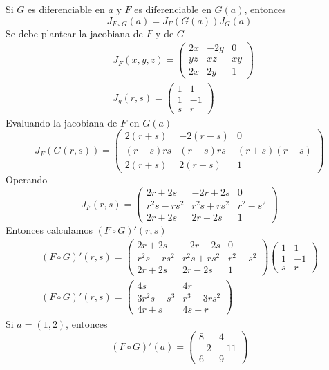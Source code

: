\documentclass[a4,11pt]{aleph-examen}
\begin{document}
\begin{preguntas}
\begin{respuesta}
\begin{respuesta}
\begin{respuesta} 
	Si $G$ es diferenciable en $a$ y $F$ es diferenciable en $G(a)$, entonces
    \[ 
        J_{F\circ G} (a)= J_F (G(a))J_G (a)
    \]
    Se debe plantear la jacobiana de $F$ y de $G$
    \begin{align*}
        &J_F(x,y,z) = \begin{pmatrix}
        2x & -2y & 0 \\
        yz & xz & xy\\
        2x & 2y & 1
        \end{pmatrix}\\
        &J_g(r,s) = \begin{pmatrix}
        1 & 1  \\
        1 & -1 \\
        s & r
        \end{pmatrix}
    \end{align*}
    Evaluando la jacobiana de $F$ en $G(a)$
    \[ 
        J_F(G(r,s)) = \begin{pmatrix}
        2(r+s) & -2(r-s) & 0 \\
        (r-s)rs & (r+s)rs & (r+s)(r-s)\\
        2(r+s) & 2(r-s) & 1
        \end{pmatrix}
    \]
    Operando
    \[ 
        J_F(r,s) = \begin{pmatrix}
        2r+2s & -2r+2s & 0 \\
        r^2s-rs^2 & r^2s+rs^2 & r^2-s^2\\
        2r+2s & 2r-2s & 1
        \end{pmatrix}
	\]
    Entonces calculamos $(F\circ G)'(r,s)$ 
    \begin{align*}
        (F\circ G)'(r,s)= \begin{pmatrix}
        2r+2s & -2r+2s & 0 \\
        r^2s-rs^2 & r^2s+rs^2 & r^2-s^2\\
        2r+2s & 2r-2s & 1
        \end{pmatrix} \begin{pmatrix}
        1 & 1  \\
        1 & -1 \\
        s & r
        \end{pmatrix}\\
	    (F\circ G)'(r,s)= \begin{pmatrix}
        4s & 4r \\
        3r^2s-s^3 & r^3-3rs^2\\
        4r+s & 4s+r
        \end{pmatrix}
    \end{align*} 
    Si $a=(1,2)$, entonces
    \[ 
        (F\circ G)'(a)= \begin{pmatrix}
        8 & 4 \\
        -2 & -11\\
        6 & 9
        \end{pmatrix}
    \]
\end{respuesta}


\end{respuesta}
\end{respuesta}
\end{preguntas}
\end{document}
